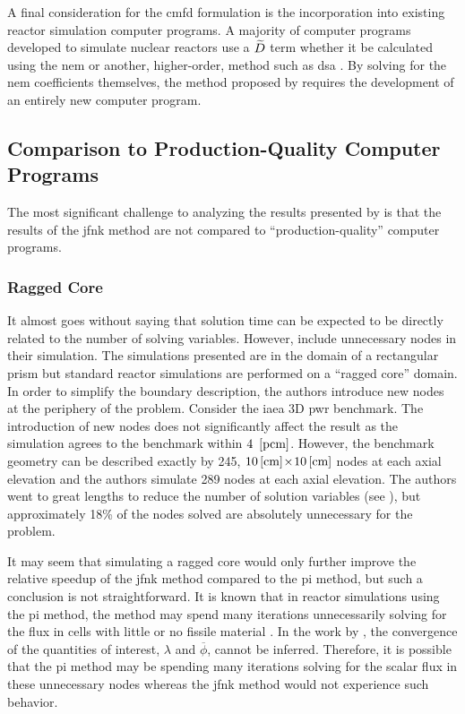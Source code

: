     A final consideration for the \gls{cmfd} formulation is the incorporation
    into existing reactor simulation computer programs. A majority of computer
    programs developed to simulate nuclear reactors use a $\widetilde{D}$ term whether
    it be calculated using the \gls{nem} or another, higher-order, method such
    as \gls{dsa} \cite{casmo4,simulate3,mpact}. By solving for the \gls{nem}
    coefficients themselves, the method proposed by \citeauthor{qe2paper}
    requires the development of an entirely new computer program.

  \subsection{Comparison to Production-Quality Computer Programs}

    The most significant challenge to analyzing the results presented by
    \citeauthor{qe2paper} is that the results of the \gls{jfnk} method are not
    compared to ``production-quality'' computer programs. 
    
    \subsubsection{Ragged Core}

      It almost goes without saying that solution time can be expected to be
      directly related to the number of solving variables. However,
      \citeauthor{qe2paper} include unnecessary nodes in their simulation. The
      simulations presented are in the domain of a rectangular prism but
      standard reactor simulations are performed on a ``ragged core'' domain. In
      order to simplify the boundary description, the authors introduce new
      nodes at the periphery of the problem. Consider the \gls{iaea} 3D
      \gls{pwr} benchmark. The introduction of new nodes does not significantly
      affect the result as the simulation agrees to the benchmark within
      $4~\left[\text{{pcm}}\right]$. However, the benchmark geometry can be described exactly
      by 245, $10\left[\text{{cm}}\right] \! \times \! 10\left[\text{{cm}}\right]$ nodes at each axial
      elevation and the authors simulate 289 nodes at each axial elevation. The
      authors went to great lengths to reduce the number of solution variables
      (see ), but approximately 18\% of the nodes
      solved are absolutely unnecessary for the problem.

      It may seem that simulating a ragged core would only further improve the
      relative speedup of the \gls{jfnk} method compared to the \gls{pi} method,
      but such a conclusion is not straightforward. It is known that in reactor
      simulations using the \gls{pi} method, the method may spend many
      iterations unnecessarily solving for the flux in cells with little or no
      fissile material \cite{gehinThesis}. In the work by \citeauthor{qe2paper},
      the convergence of the quantities of interest, $\lambda$ and
      $\overline{\phi}$, cannot be inferred. Therefore, it is possible that the
      \gls{pi} method may be spending many iterations solving for the scalar
      flux in these unnecessary nodes whereas the \gls{jfnk} method would not
      experience such behavior.

